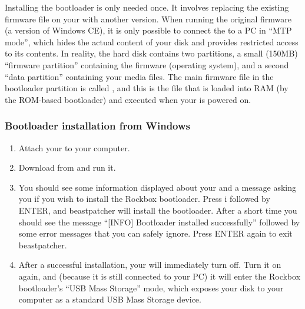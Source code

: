 

Installing the bootloader is only needed once. It involves replacing the
existing firmware file on your \dap{} with another version.
When running the original \archosplayerman{} firmware (a version of Windows CE), it is
only possible to connect the \dap{} to a PC in ``MTP mode'', which hides
the actual content of your \daps{} disk and provides restricted access
to its contents.
In reality, the \daps{} hard disk contains two partitions, a small
(150MB) ``firmware partition'' containing the \daps{} firmware (operating
system), and a second ``data partition'' containing your media files. The main
firmware file in the bootloader partition is called , and
this is the file that is loaded into RAM (by the \daps{} ROM-based
bootloader) and executed when your \dap{} is powered on.

\subsubsection{Bootloader installation from Windows}

\begin{enumerate}

\item Attach your \dap{} to your computer.

\item Download  from
and run it.

\item You should see some information displayed about
your \dap{} and a message asking you if you wish to install the Rockbox
bootloader. Press i followed by ENTER, and beastpatcher will
install the bootloader. After a short time you should see the message
``[INFO] Bootloader installed successfully'' followed by some error
messages that you can safely ignore. Press ENTER again to exit
beastpatcher.

\item After a successful installation, your \dap{} will immediately turn off.
Turn it on again, and (because it is still connected to your PC)
it will enter the Rockbox bootloader's
``USB Mass Storage'' mode, which exposes your \daps{} disk to your computer
as a standard USB Mass Storage device.
\end{enumerate}


